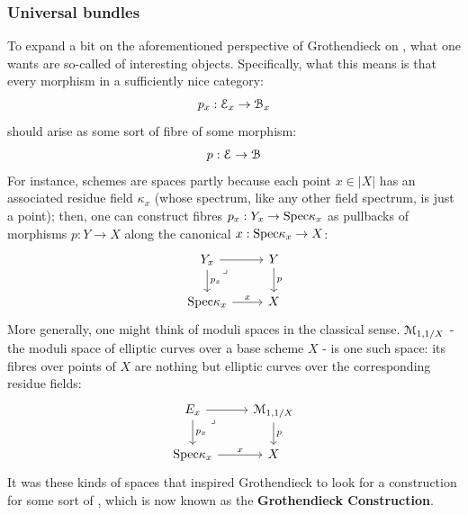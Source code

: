             \subsubsection{Universal bundles}
                To expand a bit on the aforementioned perspective of Grothendieck on , what one wants are so-called  of interesting objects. Specifically, what this means is that every morphism in a sufficiently nice category:
                    $$p_x: \mathcal{E}_x \to \mathcal{B}_x$$
                should arise as some sort of fibre of some  morphism:
                    $$p: \mathcal{E} \to \mathcal{B}$$
                For instance, schemes are  spaces partly because each point $x \in |X|$ has an associated residue field $\kappa_x$ (whose spectrum, like any other field spectrum, is just a point); then, one can construct fibres $p_x: Y_x \to \mathrm{Spec} \kappa_x$ as pullbacks of morphisms $p: Y \to X$ along the canonical  $x: \mathrm{Spec} \kappa_x \to X$: 
                    $$
                        \begin{tikzcd}
                        	{Y_x} & Y \\
                        	{\Spec \kappa_x} & X
                        	\arrow["{p_x}", from=1-1, to=2-1]
                        	\arrow["x", from=2-1, to=2-2]
                        	\arrow["p", from=1-2, to=2-2]
                        	\arrow[from=1-1, to=1-2]
                        	\arrow["\lrcorner"{anchor=center, pos=0.125}, draw=none, from=1-1, to=2-2]
                        \end{tikzcd}
                    $$
                More generally, one might think of moduli spaces in the classical sense. $\mathcal{M}_{1, 1 /X}$ - the moduli space of elliptic curves over a base scheme $X$ - is one such space: its fibres over points of $X$ are nothing but elliptic curves over the corresponding residue fields:
                    $$
                        \begin{tikzcd}
                        	{E_x} & {\calM_{1, 1 /X}} \\
                        	{\Spec \kappa_x} & X
                        	\arrow["{p_x}", from=1-1, to=2-1]
                        	\arrow["x", from=2-1, to=2-2]
                        	\arrow["p", from=1-2, to=2-2]
                        	\arrow[from=1-1, to=1-2]
                        	\arrow["\lrcorner"{anchor=center, pos=0.125}, draw=none, from=1-1, to=2-2]
                        \end{tikzcd}
                    $$
                It was these kinds of spaces that inspired Grothendieck to look for a construction for some sort of , which is now known as the \textbf{Grothendieck Construction}.
                
